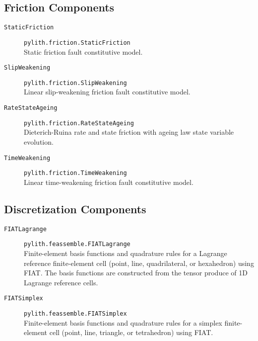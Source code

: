 \subsection{Friction Components}
\begin{description}
\item [{\texttt{StaticFriction}}] \texttt{pylith.friction.StaticFriction}\\
Static friction fault constitutive model.
\item [{\texttt{SlipWeakening}}] \texttt{pylith.friction.SlipWeakening}\\
Linear slip-weakening friction fault constitutive model.
\item [{\texttt{RateStateAgeing}}] \texttt{pylith.friction.RateStateAgeing}\\
Dieterich-Ruina rate and state friction with ageing law state variable
evolution.
\item [{\texttt{TimeWeakening}}] \texttt{pylith.friction.TimeWeakening}\\
Linear time-weakening friction fault constitutive model.
\end{description}

\subsection{Discretization Components}
\begin{description}
\item [{\texttt{FIATLagrange}}] \texttt{pylith.feassemble.FIATLagrange}\\
Finite-element basis functions and quadrature rules for a Lagrange
reference finite-element cell (point, line, quadrilateral, or hexahedron)
using FIAT. The basis functions are constructed from the tensor produce
of 1D Lagrange reference cells.
\item [{\texttt{FIATSimplex}}] \texttt{pylith.feassemble.FIATSimplex}\\
Finite-element basis functions and quadrature rules for a simplex
finite-element cell (point, line, triangle, or tetrahedron) using
FIAT.
\end{description}

